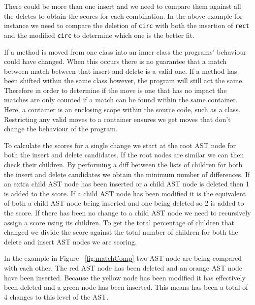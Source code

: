 There could be more than one insert and we need to compare them against all the deletes to obtain the scores for each combination.
In the above example for instance we need to compare the deletion of \lstinline{circ} with both the insertion of \lstinline{rect} and the modified \lstinline{circ} to determine which one is the better fit.

If a method is moved from one class into an inner class the programs' behaviour could have changed. 
When this occurs there is no guarantee that a match between match between that insert and delete is a valid one.
If a method has been shifted within the same class however, the program will still act the same.  
Therefore in order to determine if the move is one that has no impact the matches are only counted if a match can be found within the same container.  
Here, a container is an enclosing scope within the source code, such as a class. 
Restricting any valid moves to a container ensures we get moves that don't change the behaviour of the program.

% 

To calculate the scores for a single change we start at the root AST node for both the insert and delete candidates.  
If the root nodes are similar we can then check their children. 
By performing a diff between the lists of children for both the insert and delete candidates we obtain the minimum number of differences.  
If an extra child AST node has been inserted or a child AST node is deleted then 1 is added to the score. 
If a child AST node has been modified it is the equivalent of both a child AST node being inserted and one being deleted so 2 is added to the score. 
If there has been no change to a child AST node we need to recursively assign a score using its children. 
To get the total percentage of children that changed we divide the score against the total number of children for both the delete and insert AST nodes we are scoring.

In the example in Figure ~\ref{fig:matchComp} two AST node are being compared with each other. The red AST node has been deleted and an orange AST node have been inserted. Because the yellow node has been modified it has effectively been deleted and a green node has been inserted. This means has been a total of 4 changes to this level of the AST. 

